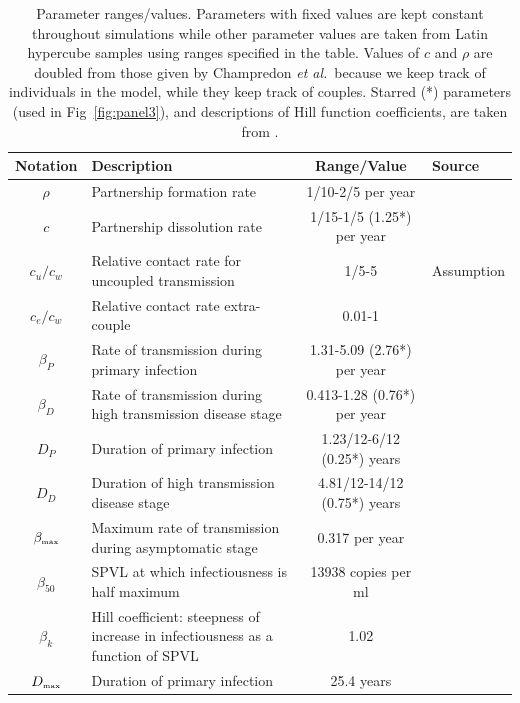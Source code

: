 \documentclass[10pt,letterpaper]{article}
\renewcommand{\figurename}{Fig}
\newcommand{\etal}{\textit{et al.}}
\newcommand{\tsub}[2]{#1_{{\textrm{\tiny #2}}}}
\begin{document}

\begin{table}[h!]
\caption{Parameter ranges/values. Parameters with fixed values are kept constant throughout simulations while other parameter values are taken from Latin hypercube samples using ranges specified in the table. Values of $c$ and $\rho$ are doubled from those given by Champredon \etal\ because we keep track of 	individuals in the model, while they keep track of couples. Starred (*) parameters (used in \figurename~\ref{fig:panel3}), and descriptions of Hill function coefficients, are taken from \cite{shirreff_transmission_2011}.}
\centering
\begin{tabular}{c p{2in} c l}
\hline 
Notation & Description & Range/Value & Source\\
\hline %
$\rho$ & Partnership formation rate & 1/10-2/5 per year & \cite{champredon_hiv_2013} \\
$c$ & Partnership dissolution rate & 1/15-1/5 (1.25*) per year & \cite{champredon_hiv_2013} \\
$c_u/c_w$ & Relative contact rate for uncoupled transmission & 1/5-5 & Assumption \\
$c_e/c_w$ & Relative contact rate extra-couple & 0.01-1 & \cite{champredon_hiv_2013} \\
$\beta_P$ & Rate of transmission during primary infection & 1.31-5.09 (2.76*) per year & \cite{hollingsworth_hiv1_2008} \\
$\beta_D$ & Rate of transmission during high transmission disease stage & 0.413-1.28 (0.76*) per year & \cite{hollingsworth_hiv1_2008} \\
$D_P$ & Duration of primary infection & 1.23/12-6/12 (0.25*) years & \cite{hollingsworth_hiv1_2008} \\
$D_D$ & Duration of high transmission disease stage & 4.81/12-14/12 (0.75*) years & \cite{hollingsworth_hiv1_2008} \\
$\tsub{\beta}{max}$ & Maximum rate of transmission during asymptomatic stage & 0.317 per year & \cite{shirreff_transmission_2011} \\
$\beta_{50}$ & SPVL at which infectiousness is half maximum & 13938 copies per ml & \cite{shirreff_transmission_2011} \\
$\beta_k$ & Hill coefficient: steepness of increase in infectiousness as a function of SPVL & 1.02 & \cite{shirreff_transmission_2011} \\
$\tsub{D}{max}$ & Duration of primary infection & 25.4 years & \cite{shirreff_transmission_2011} \\

\end{tabular}
\end{table}
\end{document}
